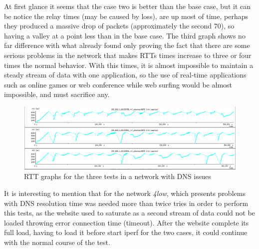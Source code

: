 At first glance it seems that the case two is better than the base case, but
it can be notice the relay times (may be caused by loss), are up most of time,
perhaps they produced a massive drop of packets (approximately the second 70),
so having a valley at a point less than in the base case. The third graph
shows no far difference with what already found only proving the fact that
there are some serious problems in the network that makes RTTs times increase
to three or four times the normal behavior. With this times, it is almost
impossible to maintain a steady stream of data with one application, so the
use of real-time applications such as online games or web conference while web
surfing would be almost impossible, and must sacrifice any.

\begin{figure}[ht]
\centering
    \includegraphics[width=\textwidth]{img/n_iperf_4low}
\caption[Iperf: RTT graphs for a network with DNS issues]{RTT graphs for the three tests in a network with DNS issues}
\label{fig:iperf4low}
\end{figure}%

It is interesting to mention that for the network \textit{4low}, which presents problems with DNS resolution time was needed more than twice tries in order to perform this tests, as the website used to saturate as a second stream of data could not be loaded throwing error connection time (timeout). After the website complete its full load, having to load it before start iperf for the two cases, it could continue with the normal course of the test.